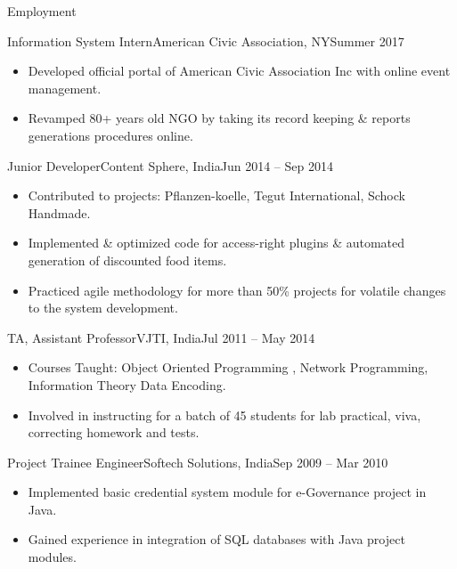 \documentclass[]{mcdowellcv}
\begin{document}
	\makeheader
	\begin{cvsection}{Employment}
		\begin{cvsubsection}{Information System Intern}{American Civic Association, NY}{Summer 2017}
			\begin{itemize}
				\item Developed official portal of American Civic Association Inc with online event management.
				\item Revamped 80+ years old NGO by taking its record keeping \& reports generations procedures online.
			\end{itemize}
		\end{cvsubsection}
		
		\begin{cvsubsection}{Junior Developer}{Content Sphere, India}{Jun 2014 -- Sep 2014}	
			\begin{itemize}
				\item Contributed to projects: Pflanzen-koelle, Tegut International, Schock Handmade.
				\item Implemented \& optimized code for access-right plugins \& automated generation of discounted food items.
				\item Practiced agile methodology for more than 50\% projects for volatile changes to the system development.
			\end{itemize}
		\end{cvsubsection}

		\begin{cvsubsection}{TA, Assistant Professor}{VJTI, India}{Jul 2011 -- May 2014}		
			\begin{itemize}
				\item Courses Taught: Object Oriented Programming , Network Programming, Information Theory Data Encoding.
				\item Involved in instructing for a batch of 45 students for lab practical, viva, correcting homework and tests.
			\end{itemize}
		\end{cvsubsection}
		
		\begin{cvsubsection}{Project Trainee Engineer}{Softech Solutions, India}{Sep 2009 -- Mar 2010}		
			\begin{itemize}
				\item Implemented basic credential system module for e-Governance project in Java.
				\item Gained experience in integration of SQL databases with Java project modules.
			\end{itemize}
		\end{cvsubsection}
	\end{cvsection}
\end{document}
